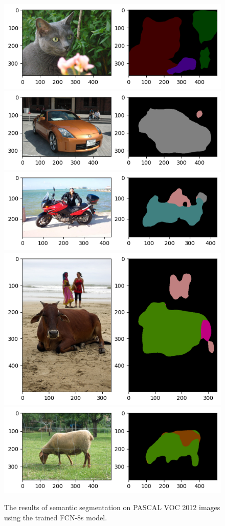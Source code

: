 \documentclass[extendedabs]{bmvc2k}
\begin{document}
\begin{figure}[t]
\centering
	\includegraphics[width=0.7\linewidth]{images/result/result1.png}
    \includegraphics[width=0.7\linewidth]{images/result/result2.png}
    \includegraphics[width=0.7\linewidth]{images/result/result3.png}
    \includegraphics[width=0.7\linewidth]{images/result/result4.png}
    \includegraphics[width=0.7\linewidth]{images/result/result5.png}
    
	\caption{
		The results of semantic segmentation on PASCAL VOC 2012 images using the trained FCN-8s model. }
        \label{fig:inferresult}
	\vspace{-2mm}
\end{figure}
\end{document}
